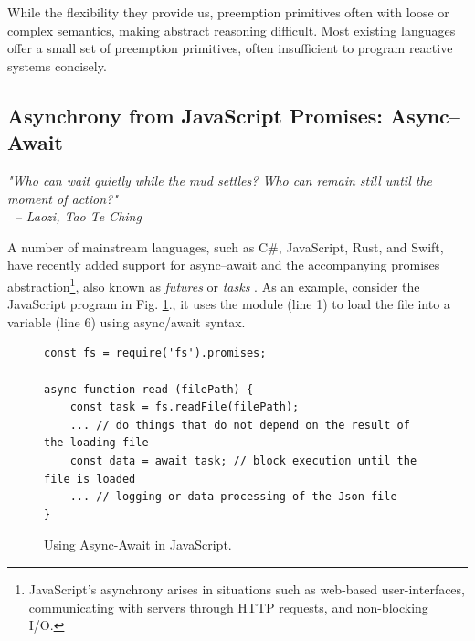 \documentclass[acmsmall,review,anonymous]{acmart}\settopmatter{printfolios=true,printccs=false,printacmref=false}
\newcommand{\code}[1]{{\tt{\ensuremath{\m{#1}}}}}
\newcommand{\m}{\mathit}
\newcommand\figref[1]{Fig. \textcolor{black}{\ref{#1}}.}
\begin{document}
While the flexibility they provide us, preemption primitives often with loose or complex semantics, making abstract reasoning difficult. 
Most existing languages offer a small set of preemption primitives, often insufficient to program reactive systems concisely. 







\subsection{Asynchrony from JavaScript Promises: Async–Await}

\noindent \textit{"Who can wait quietly while the mud settles? Who can remain still until the moment of action?"}\\
\textcolor{white}{.}\qquad\qquad\qquad\qquad\qquad\qquad\qquad\qquad\qquad\qquad\qquad\qquad\qquad\qquad\qquad \textit{ -- Laozi, Tao Te Ching}


A number of mainstream languages, such as C\code{\#}, JavaScript, Rust, and Swift, have recently added support for async–await and the accompanying promises abstraction\footnote{JavaScript's asynchrony arises in situations such as web-based user-interfaces, communicating with servers through HTTP requests, and non-blocking I/O.}, also known as \emph{futures} or \emph{tasks} \cite{bierman2012pause}. As an example, consider the JavaScript program in \figref{fig:json}, 
it uses the {} module (line 1) to load the file into a variable (line 6) using async/await syntax. 



\begin{figure}[h]
    \vspace{-2mm}
\centering
\begin{lstlisting}
const fs = require('fs').promises;

async function read (filePath) {
	const task = fs.readFile(filePath);
    ... // do things that do not depend on the result of the loading file
    const data = await task; // block execution until the file is loaded
	... // logging or data processing of the Json file 
}
\end{lstlisting}  
     \vspace{-3mm}
 \caption{Using Async-Await in JavaScript.} 
  \label{fig:json}
       \vspace{-2mm}
\end{figure}
\end{document}
